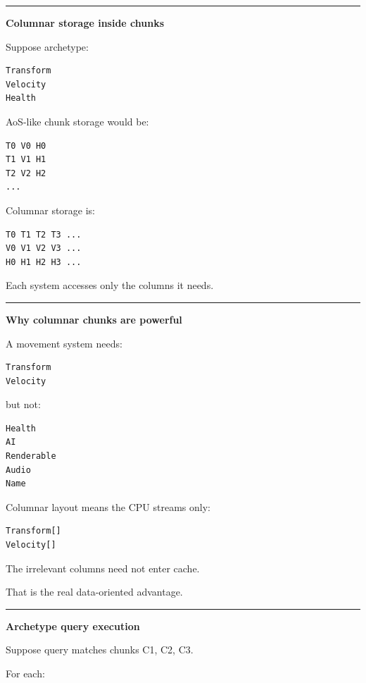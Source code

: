 \begin{center}\rule{0.5\linewidth}{0.5pt}\end{center}

\textbf{Columnar storage inside chunks}

Suppose archetype:

\begin{verbatim}
Transform
Velocity
Health
\end{verbatim}

AoS-like chunk storage would be:

\begin{verbatim}
T0 V0 H0
T1 V1 H1
T2 V2 H2
...
\end{verbatim}

Columnar storage is:

\begin{verbatim}
T0 T1 T2 T3 ...
V0 V1 V2 V3 ...
H0 H1 H2 H3 ...
\end{verbatim}

Each system accesses only the columns it needs.

\begin{center}\rule{0.5\linewidth}{0.5pt}\end{center}

\textbf{Why columnar chunks are powerful}

A movement system needs:

\begin{verbatim}
Transform
Velocity
\end{verbatim}

but not:

\begin{verbatim}
Health
AI
Renderable
Audio
Name
\end{verbatim}

Columnar layout means the CPU streams only:

\begin{verbatim}
Transform[]
Velocity[]
\end{verbatim}

The irrelevant columns need not enter cache.

That is the real data-oriented advantage.

\begin{center}\rule{0.5\linewidth}{0.5pt}\end{center}

\textbf{Archetype query execution}

Suppose query matches chunks C1, C2, C3.

For each:

